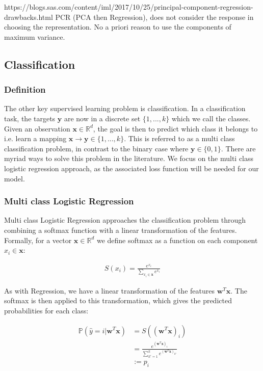 https://blogs.sas.com/content/iml/2017/10/25/principal-component-regression-drawbacks.html
PCR (PCA then Regression), does not consider the response in choosing the representation. No a priori reason to use the components of maximum variance.

\subsection{Classification}
\subsubsection{Definition}
The other key supervised learning problem is classification. In a classification task, the targets $\mathbf{y}$ are now in a discrete set $\{1, ..., k\}$ which we call the classes. Given an observation $\mathbf{x} \in \mathbb{R}^{d}$, the goal is then to predict which class it belongs to i.e. learn a mapping $\mathbf{x} \to \mathbf{y} \in \{1, ..., k\}$. This is referred to as a multi class classification problem, in contrast to the binary case where $\mathbf{y} \in \{0,1\}$. There are myriad ways to solve this problem in the literature. We focus on the multi class logistic regression approach, as the associated loss function will be needed for our model. 

\subsubsection{Multi class Logistic Regression}
\label{logisticreg}
Multi class Logistic Regression approaches the classification problem through combining a softmax function with a linear transformation of the features. Formally, for a vector $\mathbf{x}\in \mathbb{R}^d$ we define softmax as a function on each component $x_i \in \mathbf{x}$:

\begin{align}
   S(x_i) = \frac{e^{x_i}}{\sum_{x_i \in \mathbf{x}}e^{x_i}} 
\end{align}

As with Regression, we have a linear transformation of the features $\mathbf{w}^T\mathbf{x}$. The softmax is then applied to this transformation, which gives the predicted probabilities for each class: 

\begin{align}
   \mathbb{P}(\hat{y} = i | \mathbf{w}^T\mathbf{x}) &= S((\mathbf{w}^T\mathbf{x})_i)\\
   &=  \frac{e^{(\mathbf{w}^T\mathbf{x})_i}}{\sum_{k'=1}^{k} e^{(\mathbf{w}^T\mathbf{x})_{k'}}} \\
   &:= p_i
\end{align}

